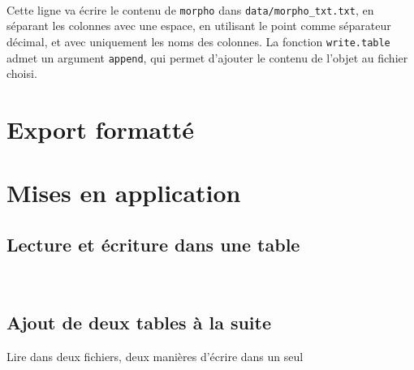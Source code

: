 \begin{knitrout}
\color{fgcolor}\begin{kframe}
\begin{flushleft}
\ttfamily\noindent
{}\hlkeyword{(}\hlkeyword{,}{\ }\hlargument{=}{\ }\hlkeyword{,}{\ }\hlargument{=}{\ }\hlkeyword{,}{\ }\hlargument{=}{\ }\hlkeyword{,}\hspace*{\fill}\\
\hlstd{}{\ }{\ }{\ }{\ }\hlargument{=}{\ }\hlkeyword{,}{\ }\hlargument{=}{\ }\hlkeyword{)}\mbox{}
\normalfont
\end{flushleft}
\end{kframe}
\end{knitrout}


\noindent Cette ligne va écrire le contenu de \texttt{morpho} dans \texttt{data/morpho\_txt.txt}, en séparant les colonnes avec une espace, en utilisant le point comme
séparateur décimal, et avec uniquement les noms des colonnes.
La fonction \texttt{write.table} admet un argument \texttt{append}, qui permet d'ajouter le contenu de l'objet au fichier choisi.

\section{Export formatté}


\section{Mises en application}

\subsection{Lecture et écriture dans une table}

\begin{knitrout}
\color{fgcolor}\begin{kframe}
\begin{flushleft}
\ttfamily\noindent
{}\hlkeyword{(}\hlkeyword{,}{\ }\hlargument{=}{\ }\hlkeyword{,}{\ }\hlargument{=}{\ }\hlkeyword{,}{\ }\hlargument{=}{\ }\hlkeyword{,}\hspace*{\fill}\\
\hlstd{}{\ }{\ }{\ }{\ }\hlargument{=}{\ }\hlkeyword{,}{\ }\hlargument{=}{\ }\hlkeyword{)}\mbox{}
\normalfont
\end{flushleft}
\end{kframe}
\end{knitrout}


\subsection{Ajout de deux tables à la suite}

Lire dans deux fichiers, deux manières d'écrire dans un seul
